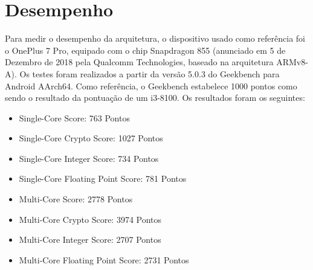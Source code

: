 \documentclass[12pt,a4paper,utf8]{ppgsi}
\begin{document}
\section{Desempenho}
Para medir o desempenho da arquitetura, o dispositivo usado como referência foi o OnePlus 7 Pro, equipado com o chip Snapdragon 855 (anunciado em 5 de Dezembro de 2018 pela Qualcomm Technologies, baseado na arquitetura ARMv8-A). Os testes foram realizados a partir da versão 5.0.3 do Geekbench para Android AArch64. Como referência, o Geekbench estabelece 1000 pontos como sendo o resultado da pontuação de um i3-8100. Os resultados foram os seguintes:
\begin{itemize}
      \item Single-Core Score: 763 Pontos
      \item Single-Core Crypto Score: 1027 Pontos
      \item Single-Core Integer Score: 734 Pontos
      \item Single-Core Floating Point Score: 781 Pontos
      \item Multi-Core Score: 2778 Pontos
      \item Multi-Core Crypto Score: 3974 Pontos
      \item Multi-Core Integer Score: 2707	Pontos
      \item Multi-Core Floating Point Score: 2731 Pontos
      
\end{itemize}




\nocite{manual}
\nocite{pressreal}
\nocite{pressarmv86}
\nocite{pressSdragon}
\nocite{bench}
\end{document}
